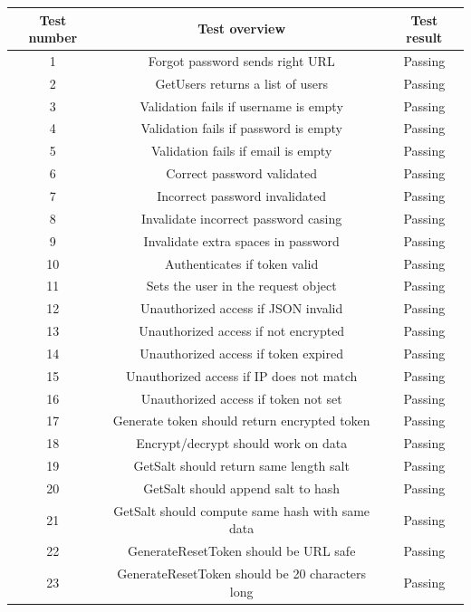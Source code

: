 \documentclass[a4paper,12pt]{article}
\begin{document}
   			\begin{tabular}{ |c|c|c| } 
    			\hline
    			Test number & Test overview & Test result \\
    			\hline
    			1 & Forgot password sends right URL & Passing\\
    			\hline
    			2 & GetUsers returns a list of users & Passing\\
    			\hline
    			3 & Validation fails if username is empty & Passing\\
    			\hline
    			4 & Validation fails if password is empty & Passing\\
    			\hline
    			5 & Validation fails if email is empty & Passing\\
    			\hline
    			6 & Correct password validated & Passing\\
    			\hline
    			7 & Incorrect password invalidated & Passing\\
    			\hline
    			8 & Invalidate incorrect password casing & Passing\\
    			\hline
    			9 & Invalidate extra spaces in password & Passing\\
    			\hline
    			10 & Authenticates if token valid & Passing\\
    			\hline
    			11 & Sets the user in the request object & Passing\\
    			\hline
    			12 & Unauthorized access if JSON invalid & Passing\\
    			\hline
    			13 & Unauthorized access if not encrypted & Passing\\
    			\hline
    			14 & Unauthorized access if token expired & Passing\\
    			\hline
    			15 & Unauthorized access if IP does not match & Passing\\
    			\hline
    			16 & Unauthorized access if token not set & Passing\\
    			\hline
    			17 & Generate token should return encrypted token & Passing\\
    			\hline
    			18 & Encrypt/decrypt should work on data & Passing\\
    			\hline
    			19 & GetSalt should return same length salt & Passing\\
    			\hline
    			20 & GetSalt should append salt to hash & Passing\\
    			\hline
    			21 & GetSalt should compute same hash with same data & Passing\\
    			\hline
    			22 & GenerateResetToken should be URL safe & Passing\\
    			\hline
    			23 & GenerateResetToken should be 20 characters long & Passing\\
    			\hline
    		\end{tabular}
    		
\end{document}
